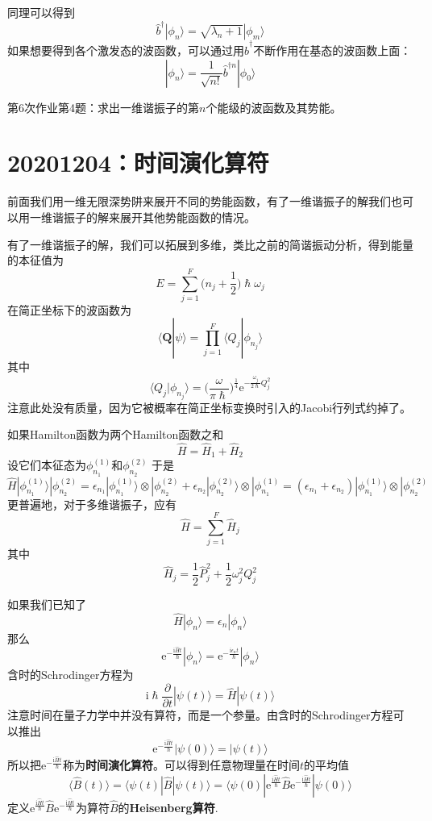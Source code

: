         同理可以得到
        \[ \hat{b}^\dagger|\phi_n\rangle = \sqrt{\lambda_n+1}|\phi_m\rangle \]
        如果想要得到各个激发态的波函数，可以通过用$\hat{b}^\dagger$不断作用在基态的波函数上面：
        \[ |\phi_n \rangle = \frac 1{\sqrt{n!}} \hat{b}^{\dagger n} | \phi_0 \rangle \]

        \begin{asg}
            第6次作业第4题：求出一维谐振子的第$n$个能级的波函数及其势能。
        \end{asg}

    \section{20201204：时间演化算符}
        前面我们用一维无限深势阱来展开不同的势能函数，有了一维谐振子的解我们也可以用一维谐振子的解来展开其他势能函数的情况。

        有了一维谐振子的解，我们可以拓展到多维，类比之前的简谐振动分析，得到能量的本征值为
        \[ E = \sum_{j=1}^F \bigg(n_j+\frac 12\bigg)\hslash \omega_j \]
        在简正坐标下的波函数为
        \[ \langle \bm{Q}|\psi \rangle = \prod_{j=1}^F \langle Q_j | \phi_{n_j} \rangle \]
        其中
        \[ \langle Q_j|\phi_{n_j} \rangle = \bigg(\frac {\omega}{\pi \hslash}\bigg)^{\frac 14} \mathrm{e}^{-\frac {\omega_j}{2\hslash} Q_j^2} \]
        注意此处没有质量，因为它被概率在简正坐标变换时引入的Jacobi行列式约掉了。

        如果Hamilton函数为两个Hamilton函数之和
        \[ \hat{H} = \hat{H}_1 + \hat{H}_2 \]
        设它们本征态为$\phi_{n_1}^{(1)}$和$\phi_{n_2}^{(2)}$
        于是
        \[\hat{H} |\phi_{n_1}^{(1)} \rangle |\phi_{n_2}^{(2)} = \epsilon_{n_1}|\phi_{n_1}^{(1)} \rangle \otimes |\phi_{n_2}^{(2)} + \epsilon_{n_2}|\phi_{n_2}^{(2)} \rangle \otimes |\phi_{n_1}^{(1)} = (\epsilon_{n_1}+\epsilon_{n_2})|\phi_{n_1}^{(1)} \rangle \otimes |\phi_{n_2}^{(2)}\]
        更普遍地，对于多维谐振子，应有
        \[ \hat{H} = \sum_{j=1}^F \hat{H}_j \]
        其中 
        \[ \hat{H}_j = \frac 12 \hat{P}_j^2 + \frac 12 \omega_j^2 Q_j^2 \]

        如果我们已知了
        \[ \hat{H}|\phi_n\rangle = \epsilon_n|\phi_n\rangle \]
        那么
        \[ \mathrm{e}^{-\frac {\mathrm{i}\hat{H}t}{\hslash}}|\phi_n\rangle = \mathrm{e}^{-\frac {\mathrm{i}\epsilon_n t}{\hslash}}|\phi_n\rangle \]
        含时的Schrodinger方程为
        \[ \mathrm{i}\hslash \frac {\partial}{\partial t}|\psi(t)\rangle = \hat{H} |\psi(t)\rangle \]
        注意时间在量子力学中并没有算符，而是一个参量。由含时的Schrodinger方程可以推出
        \[ \mathrm{e}^{-\frac {\mathrm{i}\hat{H}t}{\hslash}}|\psi(0)\rangle = |\psi(t) \rangle \]
        所以把$\mathrm{e}^{-\frac {\mathrm{i}\hat{H}t}{\hslash}}$称为\textbf{时间演化算符}。可以得到任意物理量在时间$t$的平均值 
        \[ \langle \hat{B}(t) \rangle = \langle \psi(t)|\hat{B} | \psi(t) \rangle = \langle \psi(0) |\mathrm{e}^{\frac {\mathrm{i}\hat{H}t}{\hslash}} \hat{B} \mathrm{e}^{-\frac {\mathrm{i}\hat{H}t}{\hslash}}|\psi(0) \rangle \]
        定义$\mathrm{e}^{\frac {\mathrm{i}\hat{H}t}{\hslash}} \hat{B} \mathrm{e}^{-\frac {\mathrm{i}\hat{H}t}{\hslash}}$为算符$\hat{B}$的\textbf{Heisenberg算符}.

